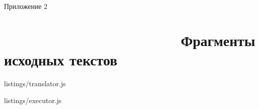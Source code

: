 \clearpage
\begin{flushright}
	Приложение 2
\end{flushright}

\section[Приложение 2. Фрагменты исходных текстов]{                      Фрагменты исходных текстов}

\renewcommand{\thelstlisting}{П2.\arabic{lstlisting}}
\setcounter{lstlisting}{0}



{listings/translator.js}


{listings/executor.js}